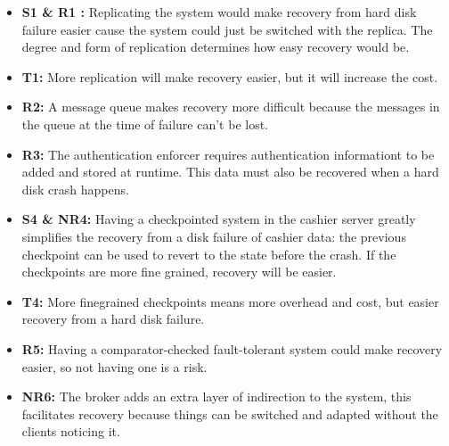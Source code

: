 \documentclass[a4paper,11pt]{report}
\begin{document}
\begin{itemize}
\item \textbf{S1 \& R1 :} Replicating the system would make recovery from hard disk failure easier cause the system
could just be switched with the replica. The degree and form of replication determines how easy recovery would be.
\item \textbf{T1:} More replication will make recovery easier, but it will increase the cost.
\item \textbf{R2:} A message queue makes recovery more difficult because the messages in the queue at the time 
of failure can't be lost.
\item \textbf{R3:} The authentication enforcer requires authentication informationt to be added and stored
at runtime. This data must also be recovered when a hard disk crash happens.
\item \textbf{S4 \& NR4:} Having a checkpointed system in the cashier server greatly simplifies the recovery
from a disk failure of cashier data: the previous checkpoint can be used to revert to the state before the crash.
If the checkpoints are more fine grained, recovery will be easier.
\item \textbf{T4:} More finegrained checkpoints means more overhead and cost, but easier recovery from a hard disk failure.
\item \textbf{R5:} Having a comparator-checked fault-tolerant system could make recovery easier, so 
not having one is a risk.
\item \textbf{NR6:} The broker adds an extra layer of indirection to the system, this facilitates recovery because
things can be switched and adapted without the clients noticing it.
\end{itemize}
\end{document}
